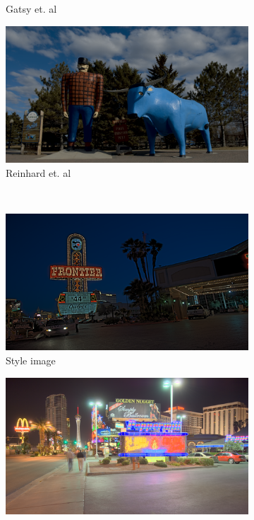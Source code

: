 {\begin{landscape}
\begin{figure}
\begin{subfigure}[b]{0.41\textwidth}
    \caption{Gatsy et. al~\cite{gatys2016image}}
    \label{fig:neuro_style_result_1}
\end{subfigure}\hfill
\begin{subfigure}[b]{0.41\textwidth}
    \centering
    \includegraphics[width=\textwidth]{figures/reinhard_color_transfer/PaulBunyan_PeckLake_candy.png}
    \caption{Reinhard et. al~\cite{reinhard2001color}}
    \label{fig:reinhard_color_result_1}
\end{subfigure}\hfill\\ 
\begin{subfigure}[b]{0.41\textwidth}
    \centering
    \includegraphics[width=\textwidth]{figures/neuro_style_transfer/Frontier.hdr_candy_scaled.png}
    \caption{Style image}
\end{subfigure}\hfill
\begin{subfigure}[b]{0.41\textwidth}
    \centering
    \includegraphics[width=\textwidth]{figures/neuro_style_transfer/Peppermill_reinhard02.png}

\end{subfigure}
\end{figure}
\end{landscape}}
